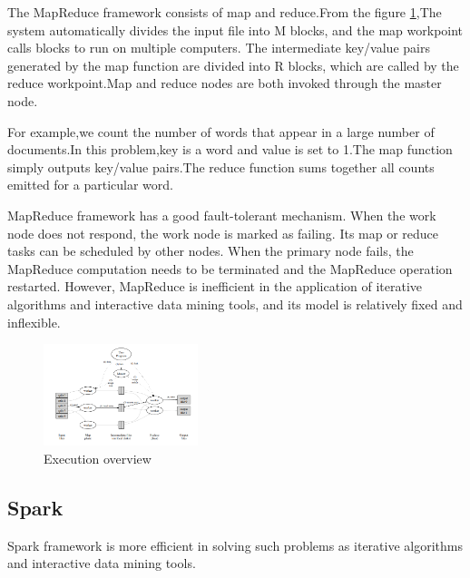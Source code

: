\documentclass[journal]{IEEEtran}
\begin{document}
The MapReduce\cite{MapReduce} framework consists of map and reduce.From the figure \ref{figure1},The system automatically divides the input file into M blocks, and the map workpoint calls blocks to run on multiple computers. The intermediate key/value pairs generated by the map function are divided into R blocks, which are called by the reduce workpoint.Map and reduce nodes are both invoked through the master node.

For example,we count the number of words that appear in a large number of documents.In this problem,key is a word and value is set to 1.The map function simply outputs key/value pairs.The reduce function sums together all counts emitted for a particular word.









MapReduce framework has a good fault-tolerant mechanism. When the work node does not respond, the work node is marked as failing. Its map or reduce tasks can be scheduled by other nodes. When the primary node fails, the MapReduce computation needs to be terminated and the MapReduce operation restarted. However, MapReduce is inefficient in the application of iterative algorithms and interactive data mining tools, and its model is relatively fixed and inflexible.
\begin{figure}
	\centering
	\includegraphics[width = 0.4\textwidth]{1.png}
	\caption{Execution overview}
	\label{figure1}
\end{figure} 

\subsection{Spark}
Spark framework\cite{Spark} is more efficient in solving such problems as iterative algorithms and interactive data mining tools.
\end{document}
